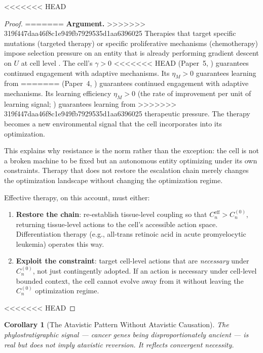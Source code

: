 \documentclass[11pt]{article}
\newtheorem{corollary}[theorem]{Corollary}
\theoremstyle{definition}
\theoremstyle{remark}
\begin{document}
<<<<<<< HEAD
\begin{proof}
=======
\textbf{Argument.}
>>>>>>> 319f447daa46f8c1e949fb7929535d1aa6396025
Therapies that target specific mutations (targeted therapy) or
specific proliferative mechanisms (chemotherapy) impose selection
pressure on an entity that is already performing gradient descent on
$U$ at cell level \cite{McCarthy2026d}. The cell's $\gamma > 0$
<<<<<<< HEAD
(Paper~5, \cite{McCarthy2026e}) guarantees continued engagement with
adaptive mechanisms. Its $\eta_M > 0$ guarantees learning from
=======
(Paper~4, \cite{McCarthy2026d}) guarantees continued engagement with
adaptive mechanisms. Its learning efficiency $\eta_M > 0$
(the rate of improvement per unit of learning signal;
\cite{McCarthy2026d}) guarantees learning from
>>>>>>> 319f447daa46f8c1e949fb7929535d1aa6396025
therapeutic pressure. The therapy becomes a new environmental signal
that the cell incorporates into its optimization.

This explains why resistance is the norm rather than the exception:
the cell is not a broken machine to be fixed but an autonomous
entity optimizing under its own constraints. Therapy that does not
restore the escalation chain merely changes the optimization
landscape without changing the optimization regime.

Effective therapy, on this account, must either:
\begin{enumerate}
\item \textbf{Restore the chain}: re-establish tissue-level coupling
   so that $C_n^{\mathrm{eff}} > C_n^{(0)}$, returning tissue-level
   actions to the cell's accessible action space. Differentiation
   therapy (e.g., all-trans retinoic acid in acute promyelocytic
   leukemia) operates this way.
\item \textbf{Exploit the constraint}: target cell-level actions
   that are \emph{necessary} under $C_n^{(0)}$, not just contingently
   adopted. If an action is necessary under cell-level bounded
   context, the cell cannot evolve away from it without leaving the
   $C_n^{(0)}$ optimization regime.
\end{enumerate}
<<<<<<< HEAD
\end{proof}

\begin{corollary}[The Atavistic Pattern Without Atavistic Causation]
\label{cor:atavistic}
The phylostratigraphic signal --- cancer genes being
disproportionately ancient \cite{Trigos2017} --- is real but does
not imply atavistic reversion. It reflects convergent necessity.
\end{corollary}
\end{document}
